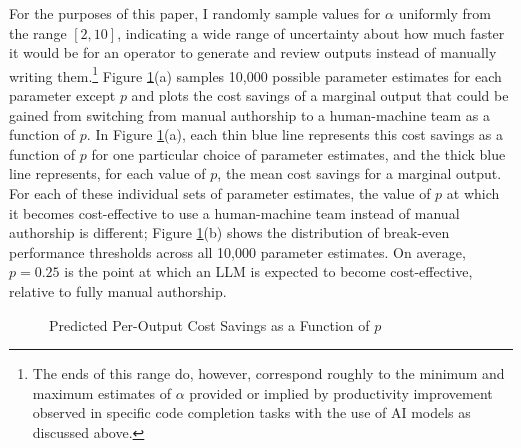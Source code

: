 \documentclass{article}
\begin{document}
For the purposes of this paper, I randomly sample values for $\alpha$ uniformly from the range $[2, 10]$, indicating a wide range of uncertainty about how much faster it would be for an operator to generate and review outputs instead of manually writing them.\footnote{The ends of this range do, however, correspond roughly to the minimum and maximum estimates of $\alpha$ provided or implied by productivity improvement observed in specific code completion tasks with the use of AI models as discussed above.} Figure \ref{fig:costsavings}(a) samples 10,000 possible parameter estimates for each parameter except $p$ and plots the cost savings of a marginal output that could be gained from switching from manual authorship to a human-machine team as a function of $p$. In Figure \ref{fig:costsavings}(a), each thin blue line represents this cost savings as a function of $p$ for one particular choice of parameter estimates, and the thick blue line represents, for each value of $p$, the mean cost savings for a marginal output. For each of these individual sets of parameter estimates, the value of $p$ at which it becomes cost-effective to use a human-machine team instead of manual authorship is different; Figure \ref{fig:costsavings}(b) shows the distribution of break-even performance thresholds across all 10,000 parameter estimates. On average, $p = 0.25$ is the point at which an LLM is expected to become cost-effective, relative to fully manual authorship.

\begin{figure}[h]
  \centering
  \caption{Predicted Per-Output Cost Savings as a Function of $p$}
  \label{fig:costsavings}
\end{figure}
\end{document}
